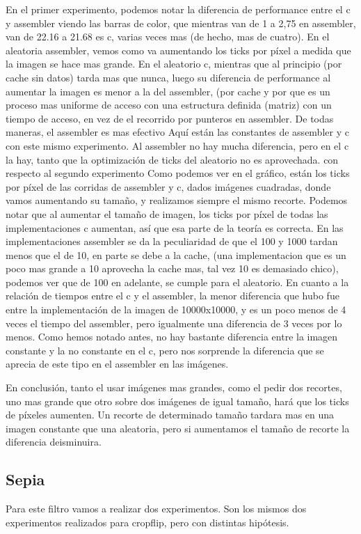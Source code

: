 \hfill \break
En el primer experimento, podemos notar la diferencia de performance entre el c y assembler viendo las barras de color, que mientras van de 1 a 2,75 en assembler, van de  22.16 a 21.68 es c, varias veces mas (de hecho, mas de cuatro). En el aleatoria assembler, vemos como va aumentando los ticks por píxel a medida que la imagen se hace mas grande. En el aleatorio c, mientras que al principio (por cache sin datos) tarda mas que nunca, luego su diferencia de performance al aumentar la imagen es menor a la del assembler, (por cache y por que es un proceso mas uniforme de acceso con una estructura definida (matriz) con un tiempo de acceso, en vez de el recorrido por punteros en assembler. De todas maneras, el assembler es mas efectivo
\hfill \break
Aquí están las constantes de assembler y c con este mismo experimento. Al assembler no hay mucha diferencia, pero en el c la hay, tanto que la optimización de ticks del aleatorio no es aprovechada.
\hfill \break
con respecto al segundo experimento
\hfill \break
Como podemos ver en el gráfico, están los ticks por píxel de las corridas de assembler y c, dados imágenes cuadradas, donde vamos aumentando su tamaño, y realizamos siempre el mismo recorte. 
Podemos notar que al aumentar el tamaño de imagen, los ticks por píxel de todas las implementaciones c aumentan, así que esa parte de la teoría es correcta. En las implementaciones assembler se da la peculiaridad de que el 100 y 1000 tardan menos que el de 10, en parte se debe a la cache, (una implementacion que es un poco mas grande a 10 aprovecha la cache mas, tal vez 10 es demasiado chico), podemos ver que de 100 en adelante, se cumple para el aleatorio.  
        En cuanto a la relación de tiempos entre el c y el assembler, la menor diferencia que hubo fue entre la implementación de la imagen de 10000x10000, y es un poco menos de 4 veces el tiempo del assembler, pero igualmente una diferencia de 3 veces por lo menos. Como hemos notado antes, no hay bastante diferencia  entre la imagen constante y la no constante en el c, pero nos sorprende la diferencia que se aprecia de este tipo en el assembler en las imágenes.   
         
 \hfill \break
En conclusión, tanto el usar imágenes mas grandes, como el pedir dos recortes, uno mas grande que otro sobre dos imágenes de igual tamaño, hará que los ticks de píxeles aumenten. Un recorte de determinado tamaño tardara mas en una imagen constante que una aleatoria, pero si aumentamos el tamaño de  recorte la diferencia deisminuira. 
\hfill \break
\subsection{Sepia}
Para este filtro vamos a realizar dos experimentos. Son los mismos dos experimentos realizados para cropflip, pero con distintas hipótesis.
\hfill \break
 

